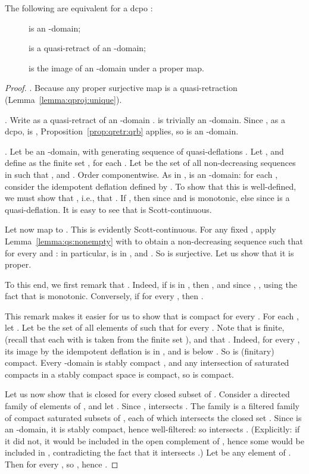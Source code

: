 \documentclass{LMCS}
\begin{document}
\begin{thm}
  \label{thm:qrb:qretr}
  The following are equivalent for a dcpo :
  \begin{description}
  \item[]  is an -domain;
  \item[]  is a quasi-retract of an -domain;
  \item[]  is the image of an -domain under a proper map.
  \end{description}
\end{thm}
\begin{proof}
  .  Because any proper surjective map is a
  quasi-retraction (Lemma~\ref{lemma:qproj:unique}).

  .  Write  as a quasi-retract of an
  -domain .   is trivially an -domain.
  Since , as a dcpo, is , Proposition~\ref{prop:qretr:qrb}
  applies, so  is an -domain.

  .  Let  be an -domain, with
  generating sequence of quasi-deflations .  Let , and define  as the finite set , for each .  Let  be the set of all
  non-decreasing sequences  in  such
  that , and .  Order  componentwise.  As in
  \cite[Theorem~4.9, Theorem~4.1]{Jung:CCC},  is an
  -domain: for each , consider the idempotent
  deflation  defined by .  To show that this is well-defined, we
  must show that , i.e., that .  If , then 
  since  and  is monotonic, else  since  is a
  quasi-deflation.  It is easy to see that  is
  Scott-continuous.

  Let now  map  to .  This
  is evidently Scott-continuous.  For any fixed , apply
  Lemma~\ref{lemma:qs:nonempty} with  to
  obtain a non-decreasing sequence 
  such that  for every  and
  : in particular,  is in , and
  .  So  is surjective.  Let us show that it is
  proper.

  To this end, we first remark that .  Indeed, if
   is in , then , and since ,
  ,
  using the fact that  is monotonic.  Conversely, if  for every , then .

  This remark makes it easier for us to show that  is
  compact for every .  For each , let .  Let  be the set of all elements  of
   such that  for every .  Note
  that  is finite, (recall that each  with 
  is taken from the finite set ), and that
  .  Indeed, for every ,
  its image  by the idempotent deflation 
  is in , and is below .  So  is (finitary)
  compact.  Every -domain is stably compact
  \cite[Theorem~4.2.18]{AJ:domains}, and any intersection of saturated
  compacts in a stably compact space is compact, so  is compact.

  Let us now show that  is closed for every closed subset
   of .  Consider a directed family  of
  elements of , and let .  Since
  ,  intersects .  The family
   is a filtered family of compact
  saturated subsets of , each of which intersects the closed set
  .  Since  is an -domain, it is stably compact, hence
  well-filtered: so 
  intersects .  (Explicitly: if it did not, it would be included in
  the open complement  of , hence some  would
  be included in , contradicting the fact that it intersects .)
  Let  be any element of .  Then  for every ,
  so , hence .
\end{proof}
\end{document}
